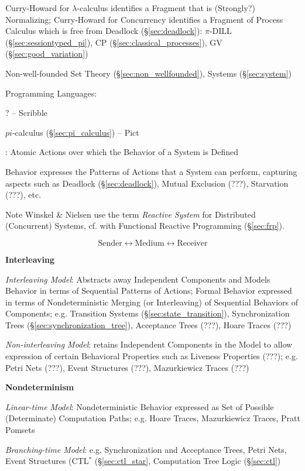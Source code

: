 Curry-Howard for $\lambda$-calculus identifies a Fragment that is
(Strongly?) Normalizing; Curry-Howard for Concurrency identifies a
Fragment of Process Calculus which is free from Deadlock
(\S\ref{sec:deadlock}): $\pi$-DILL
(\S\ref{sec:sessiontyped_pi}), CP
(\S\ref{sec:classical_processes}), GV (\S\ref{sec:good_variation})

Non-well-founded Set Theory (\S\ref{sec:non_wellfounded}), Systems
(\S\ref{sec:system})


\asterism

Programming Languages:

? -- Scribble

$pi$-calculus (\S\ref{sec:pi_calculus}) -- Pict


\asterism


\cite{winskel-nielsen93}: Atomic Actions over which the Behavior of a
System is Defined %

Behavior expresses the Patterns of Actions that a System can perform,
capturing aspects such as Deadlock (\S\ref{sec:deadlock}), Mutual
Exclusion (???), Starvation (???), etc.

\fist Note Winskel \& Nielsen \cite{winskel-nielsen93} use the term
\emph{Reactive System} for Distributed (Concurrent) Systems, cf. with
Functional Reactive Programming (\S\ref{sec:frp}).

\[
  \text{Sender} \leftrightarrow \text{Medium}
    \leftrightarrow \text{Receiver}
\]


\textbf{Interleaving}

\emph{Interleaving Model}: Abstracts away Independent Components and
Models Behavior in terms of Sequential Patterns of Actions; Formal
Behavior expressed in terms of Nondeterministic Merging (or
Interleaving) of Sequential Behaviors of Components; e.g. Transition
Systems (\S\ref{sec:state_transition}), Synchronization Trees
(\S\ref{sec:synchronization_tree}), Acceptance Trees (???), Hoare
Traces (???) %

\emph{Non-interleaving Model}: retains Independent Components in the
Model to allow expression of certain Behavioral Properties such as
Liveness Properties (???); e.g. Petri Nets (???), Event Structures
(???), Mazurkiewicz Traces (???)


\textbf{Nondeterminism}

\emph{Linear-time Model}: Nondeterministic Behavior expressed as Set of
Possible (Determinate) Computation Paths; e.g. Hoare Traces,
Mazurkiewicz Traces, Pratt Pomsets

\emph{Branching-time Model}: e.g. Synchronization and Acceptance
Trees, Petri Nets, Event Structures (CTL$^*$ (\S\ref{sec:ctl_star},
Computation Tree Logic (\S\ref{sec:ctl})


